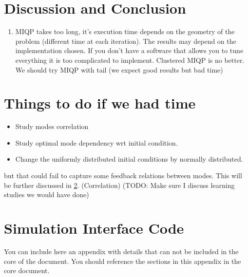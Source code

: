 \documentclass[12,twoside]{TFG-GM}
\theoremstyle{definition}
\theoremstyle{remark}
\begin{document}
\section{Discussion and Conclusion}
\label{sec:conclusion}
\begin{enumerate}
\item{MIQP} takes too long, it's execution time depends on the geometry of the problem (different time at each iteration). The results may depend on the implementation chosen. If you don't have a software that allows you to tune everything it is too complicated to implement. Clustered MIQP is no better. We should try MIQP with tail (we expect good results but bad time)
\end{enumerate}

\section{Things to do if we had time}
\label{sec:todo}
\begin{itemize}
\item Study modes correlation
\item Study optimal mode dependency wrt initial condition.
\item Change the uniformly distributed initial conditions by normally distributed.
\end{itemize}
 
 but that could fail to capture some feedback relations between modes. This will be further discussed in \ref{sec:todo}. (Correlation)
(TODO: Make sure I discuss learning studies we would have done)
\newpage

{}


\appendix
\vfill\newpage \section{Simulation Interface Code}
\label{app:code}
You can include here an appendix with details that can not be included in the core of the document. You should reference the sections in this appendix in the core document.
\end{document}
